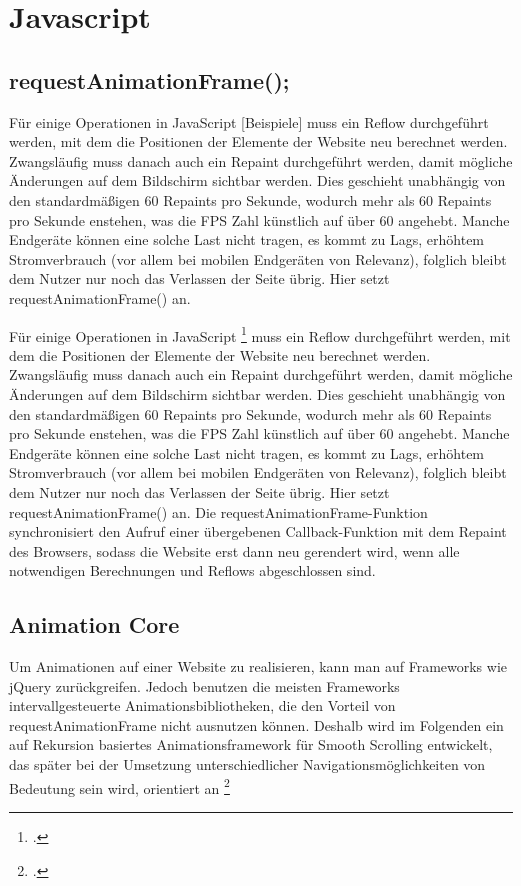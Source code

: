 \section{Javascript}

	\subsection{requestAnimationFrame();}

Für einige Operationen in JavaScript [Beispiele] muss ein Reflow durchgeführt werden, mit dem die Positionen der Elemente der Website neu berechnet werden. Zwangsläufig muss danach auch ein Repaint durchgeführt werden, damit mögliche Änderungen auf dem Bildschirm sichtbar werden. Dies geschieht unabhängig von den standardmäßigen 60 Repaints pro Sekunde, wodurch mehr als 60 Repaints pro Sekunde enstehen, was die FPS Zahl künstlich auf über 60 angehebt. Manche Endgeräte können eine solche Last nicht tragen, es kommt zu Lags, erhöhtem Stromverbrauch (vor allem bei mobilen Endgeräten von Relevanz), folglich bleibt dem Nutzer nur noch das Verlassen der Seite übrig. Hier setzt requestAnimationFrame() an.

Für einige Operationen in JavaScript \footcite[vgl.][]{reflow} muss ein Reflow durchgeführt werden, mit dem die Positionen der Elemente der Website neu berechnet werden. Zwangsläufig muss danach auch ein Repaint durchgeführt werden, damit mögliche Änderungen auf dem Bildschirm sichtbar werden. Dies geschieht unabhängig von den standardmäßigen 60 Repaints pro Sekunde, wodurch mehr als 60 Repaints pro Sekunde enstehen, was die FPS Zahl künstlich auf über 60 angehebt. Manche Endgeräte können eine solche Last nicht tragen, es kommt zu Lags, erhöhtem Stromverbrauch (vor allem bei mobilen Endgeräten von Relevanz), folglich bleibt dem Nutzer nur noch das Verlassen der Seite übrig. Hier setzt requestAnimationFrame() an.
Die requestAnimationFrame-Funktion synchronisiert den Aufruf einer übergebenen Callback-Funktion mit dem Repaint des Browsers, sodass die Website erst dann neu gerendert wird, wenn alle notwendigen Berechnungen und Reflows abgeschlossen sind.


\subsection{Animation Core}
Um Animationen auf einer Website zu realisieren, kann man auf Frameworks wie jQuery zurückgreifen. Jedoch benutzen die meisten Frameworks intervallgesteuerte Animationsbibliotheken, die den Vorteil von requestAnimationFrame nicht ausnutzen können. Deshalb wird im Folgenden ein auf Rekursion basiertes Animationsframework für Smooth Scrolling entwickelt, das später bei der Umsetzung unterschiedlicher Navigationsmöglichkeiten von Bedeutung sein wird, orientiert an \footcite[vgl.][]{rAF}

